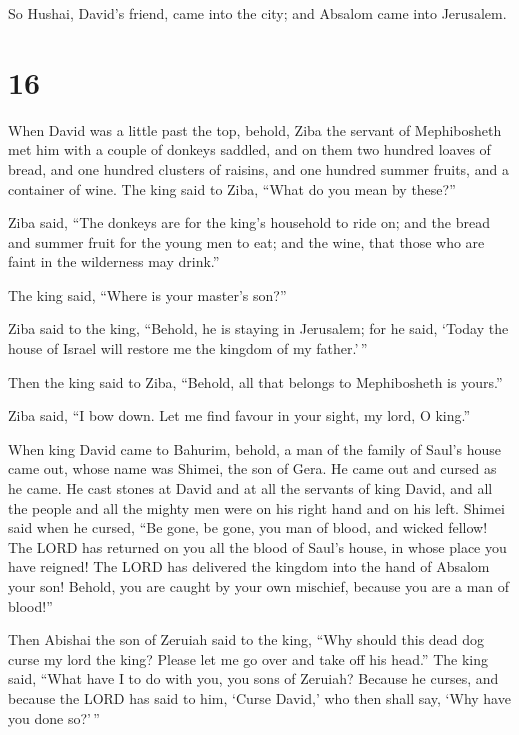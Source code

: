 So Hushai, David's friend, came into the city; and
Absalom came into Jerusalem.

\hypertarget{section-15}{%
\section{16}\label{section-15}}

 When David was a little past the top, behold, Ziba the
servant of Mephibosheth met him with a couple of donkeys saddled, and on
them two hundred loaves of bread, and one hundred clusters of raisins,
and one hundred summer fruits, and a container of wine. 
The king said to Ziba, ``What do you mean by these?''

Ziba said, ``The donkeys are for the king's household to ride on; and
the bread and summer fruit for the young men to eat; and the wine, that
those who are faint in the wilderness may drink.''

 The king said, ``Where is your master's son?''

Ziba said to the king, ``Behold, he is staying in Jerusalem; for he
said, `Today the house of Israel will restore me the kingdom of my
father.'\,''

 Then the king said to Ziba, ``Behold, all that belongs to
Mephibosheth is yours.''

Ziba said, ``I bow down. Let me find favour in your sight, my lord, O
king.''

 When king David came to Bahurim, behold, a man of the
family of Saul's house came out, whose name was Shimei, the son of Gera.
He came out and cursed as he came.  He cast stones at
David and at all the servants of king David, and all the people and all
the mighty men were on his right hand and on his left. 
Shimei said when he cursed, ``Be gone, be gone, you man of blood, and
wicked fellow!  The LORD has returned on you all the blood
of Saul's house, in whose place you have reigned! The LORD has delivered
the kingdom into the hand of Absalom your son! Behold, you are caught by
your own mischief, because you are a man of blood!''

 Then Abishai the son of Zeruiah said to the king, ``Why
should this dead dog curse my lord the king? Please let me go over and
take off his head.''  The king said, ``What have I to do
with you, you sons of Zeruiah? Because he curses, and because the LORD
has said to him, `Curse David,' who then shall say, `Why have you done
so?'\,''

